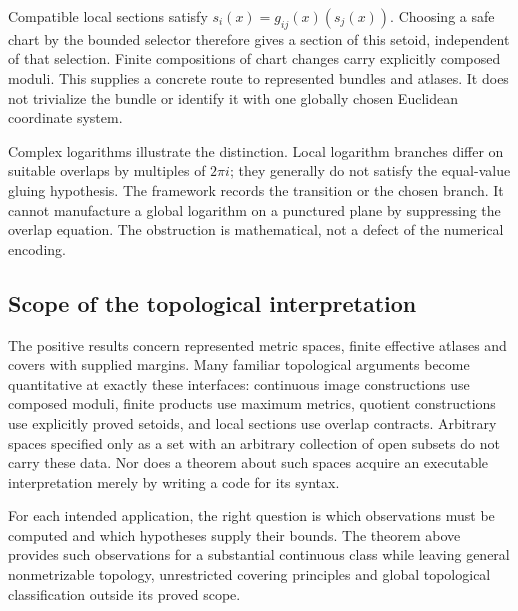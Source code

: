 Compatible local sections satisfy
$s_i(x)=g_{ij}(x)(s_j(x))$. Choosing a safe chart by the bounded selector
therefore gives a section of this setoid, independent of that selection.
Finite compositions of chart changes carry explicitly composed moduli.
This supplies a concrete route to represented bundles and atlases.
It does not trivialize the bundle or identify it with one globally chosen
Euclidean coordinate system.

Complex logarithms illustrate the distinction. Local logarithm branches
differ on suitable overlaps by multiples of $2\pi i$; they generally do
not satisfy the equal-value gluing hypothesis. The framework records the
transition or the chosen branch. It cannot manufacture a global logarithm
on a punctured plane by suppressing the overlap equation. The obstruction
is mathematical, not a defect of the numerical encoding.

\subsection{Scope of the topological interpretation}

The positive results concern represented metric spaces, finite effective
atlases and covers with supplied margins. Many familiar topological
arguments become quantitative at exactly these interfaces: continuous
image constructions use composed moduli, finite products use maximum
metrics, quotient constructions use explicitly proved setoids, and local
sections use overlap contracts. Arbitrary spaces specified only as a set
with an arbitrary collection of open subsets do not carry these data.
Nor does a theorem about such spaces acquire an executable interpretation
merely by writing a code for its syntax.

For each intended application, the right question is which observations
must be computed and which hypotheses supply their bounds. The theorem
above provides such observations for a substantial continuous class while
leaving general nonmetrizable topology, unrestricted covering principles
and global topological classification outside its proved scope.
